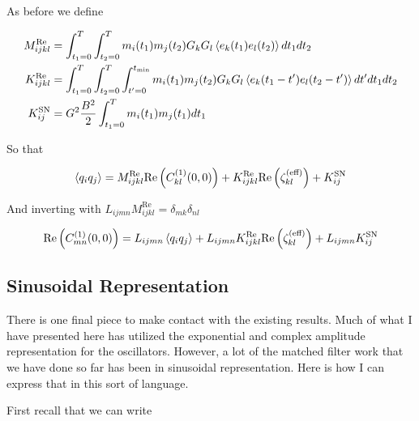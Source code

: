 \documentclass[12pt]{article}
\begin{document}
As before we define

\begin{align}
M^{\text{Re}}_{ijkl} &= \int_{t_1=0}^T \int_{t_2=0}^T m_i(t_1) m_j(t_2) G_k G_l \Braket{e_k(t_1) e_l(t_2)} dt_1 dt_2\\
K^{\text{Re}}_{ijkl} &=\int_{t_1=0}^T \int_{t_2=0}^T \int_{t'=0}^{t_{\text{min}}} m_i(t_1) m_j(t_2) G_k G_l \Braket{e_k(t_1-t')e_l(t_2-t')} dt' dt_1 dt_2\\
K^{\text{SN}}_{ij} &= G^2\frac{B^2}{2}\int_{t_1=0}^T m_i(t_1)m_j(t_1) dt_1
\end{align}

So that

\begin{align}
\Braket{q_i q_j} = M^{\text{Re}}_{ijkl} \text{Re}\left(C^{(1)}_{kl}(0,0)\right) + K^{\text{Re}}_{ijkl}\text{Re}\left(\zeta^{(\text{eff})}_{kl}\right) + K^{\text{SN}}_{ij}
\end{align}

And inverting with $L_{ijmn}M^{\text{Re}}_{ijkl} = \delta_{mk}\delta_{nl}$

\begin{align}
\text{Re}\left(C^{(1)}_{mn}(0,0)\right) = L_{ijmn}\Braket{q_i q_j} + L_{ijmn}K^{\text{Re}}_{ijkl}\text{Re}\left(\zeta^{(\text{eff})}_{kl}\right) + L_{ijmn}K^{\text{SN}}_{ij}
\end{align}

\subsection{Sinusoidal Representation}

There is one final piece to make contact with the existing results. Much of what I have presented here has utilized the exponential and complex amplitude representation for the oscillators. However, a lot of the matched filter work that we have done so far has been in sinusoidal representation. Here is how I can express that in this sort of language.

First recall that we can write
\end{document}
